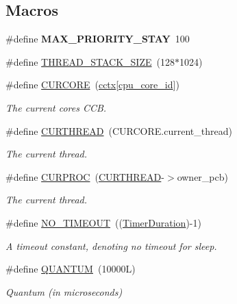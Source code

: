\subsection*{Macros}
\begin{DoxyCompactItemize}
\item 
\#define {\bfseries M\+A\+X\+\_\+\+P\+R\+I\+O\+R\+I\+T\+Y\+\_\+\+S\+T\+AY}~100\hypertarget{group__scheduler_ga5b4787ebd9ecbae612496c05d19dbb81}{}\label{group__scheduler_ga5b4787ebd9ecbae612496c05d19dbb81}

\item 
\#define \hyperlink{group__scheduler_ga90b7a8cb7bc3fdbd98014a3e15ee6e9a}{T\+H\+R\+E\+A\+D\+\_\+\+S\+T\+A\+C\+K\+\_\+\+S\+I\+ZE}~(128$\ast$1024)
\item 
\#define \hyperlink{group__scheduler_ga869aabe01f7b28027376354dd895b96b}{C\+U\+R\+C\+O\+RE}~(\hyperlink{group__scheduler_ga3be3b151b275926dff3fb99bee765eab}{cctx}\mbox{[}\hyperlink{bios_8h_abac58ced7d51f54f2318b326bc991933}{cpu\+\_\+core\+\_\+id}\mbox{]})\hypertarget{group__scheduler_ga869aabe01f7b28027376354dd895b96b}{}\label{group__scheduler_ga869aabe01f7b28027376354dd895b96b}

\begin{DoxyCompactList}\small\item\em The current core\textquotesingle{}s C\+CB. \end{DoxyCompactList}\item 
\#define \hyperlink{group__scheduler_ga587a82c8931f0df72f43cc913ceb7e27}{C\+U\+R\+T\+H\+R\+E\+AD}~(C\+U\+R\+C\+O\+R\+E.\+current\+\_\+thread)
\begin{DoxyCompactList}\small\item\em The current thread. \end{DoxyCompactList}\item 
\#define \hyperlink{group__scheduler_gae3437e8e6787ef05b6576d03c5b6a0ca}{C\+U\+R\+P\+R\+OC}~(\hyperlink{group__scheduler_ga587a82c8931f0df72f43cc913ceb7e27}{C\+U\+R\+T\+H\+R\+E\+AD}-\/$>$owner\+\_\+pcb)
\begin{DoxyCompactList}\small\item\em The current thread. \end{DoxyCompactList}\item 
\#define \hyperlink{group__scheduler_ga462fb2ba6f2af99ec3d021ded436bb65}{N\+O\+\_\+\+T\+I\+M\+E\+O\+UT}~((\hyperlink{bios_8h_ae7291e5cd742fb9bc6d4aaa0d51bd0ee}{Timer\+Duration})-\/1)\hypertarget{group__scheduler_ga462fb2ba6f2af99ec3d021ded436bb65}{}\label{group__scheduler_ga462fb2ba6f2af99ec3d021ded436bb65}

\begin{DoxyCompactList}\small\item\em A timeout constant, denoting no timeout for sleep. \end{DoxyCompactList}\item 
\#define \hyperlink{group__scheduler_gabc4f0f9abea1b5443308e4ea84b52b21}{Q\+U\+A\+N\+T\+UM}~(10000\+L)
\begin{DoxyCompactList}\small\item\em Quantum (in microseconds) \end{DoxyCompactList}\end{DoxyCompactItemize}
